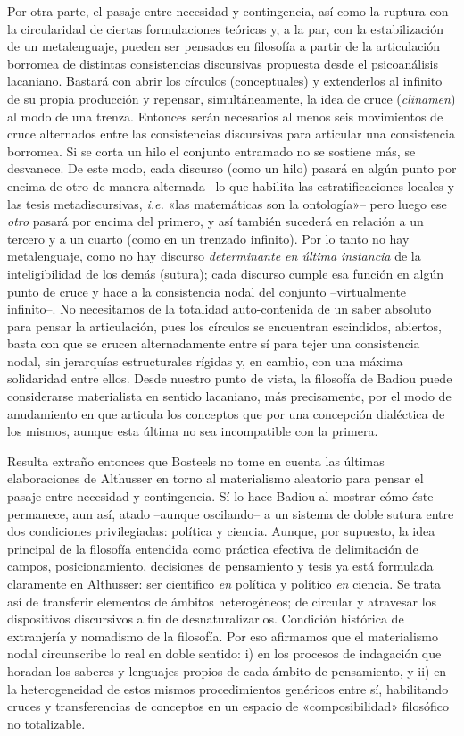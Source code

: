 Por otra parte, el pasaje entre necesidad y contingencia, así como la ruptura con la circularidad de ciertas formulaciones teóricas y, a la par, con la estabilización de un metalenguaje, pueden ser pensados en filosofía a partir de la articulación borromea de distintas consistencias discursivas propuesta desde el psicoanálisis lacaniano. Bastará con abrir los círculos (conceptuales) y extenderlos al infinito de su propia producción y repensar, simultáneamente, la idea de cruce (\emph{clinamen}) al modo de una trenza. Entonces serán necesarios al menos seis movimientos de cruce alternados entre las consistencias discursivas para articular una consistencia borromea. Si se corta un hilo el conjunto entramado no se sostiene más, se desvanece. De este modo, cada discurso (como un hilo) pasará en algún punto por encima de otro de manera alternada --lo que habilita las estratificaciones locales y las tesis metadiscursivas, \emph{i.e.} «las matemáticas son la ontología»-- pero luego ese \emph{otro} pasará por encima del primero, y así también sucederá en relación a un tercero y a un cuarto (como en un trenzado infinito). Por lo tanto no hay metalenguaje, como no hay discurso \emph{determinante en última instancia} de la inteligibilidad de los demás (sutura); cada discurso cumple esa función en algún punto de cruce y hace a la consistencia nodal del conjunto --virtualmente infinito--. No necesitamos de la totalidad auto-contenida de un saber absoluto para pensar la articulación, pues los círculos se encuentran escindidos, abiertos, basta con que se crucen alternadamente entre sí para tejer una consistencia nodal, sin jerarquías estructurales rígidas y, en cambio, con una máxima solidaridad entre ellos. Desde nuestro punto de vista, la filosofía de Badiou puede considerarse materialista en sentido lacaniano, más precisamente, por el modo de anudamiento en que articula los conceptos que por una concepción dialéctica de los mismos, aunque esta última no sea incompatible con la primera.

Resulta extraño entonces que Bosteels no tome en cuenta las últimas elaboraciones de Althusser en torno al materialismo aleatorio para pensar el pasaje entre necesidad y contingencia. Sí lo hace Badiou al mostrar cómo éste permanece, aun así, atado --aunque oscilando-- a un sistema de doble sutura entre dos condiciones privilegiadas: política y ciencia. Aunque, por supuesto, la idea principal de la filosofía entendida como práctica efectiva de delimitación de campos, posicionamiento, decisiones de pensamiento y tesis ya está formulada claramente en Althusser: ser científico \emph{en} política y político \emph{en} ciencia. Se trata así de transferir elementos de ámbitos heterogéneos; de circular y atravesar los dispositivos discursivos a fin de desnaturalizarlos. Condición histórica de extranjería y nomadismo de la filosofía. Por eso afirmamos que el materialismo nodal circunscribe lo real en doble sentido: i) en los procesos de indagación que horadan los saberes y lenguajes propios de cada ámbito de pensamiento, y ii) en la heterogeneidad de estos mismos procedimientos genéricos entre sí, habilitando cruces y transferencias de conceptos en un espacio de «composibilidad» filosófico no totalizable.

